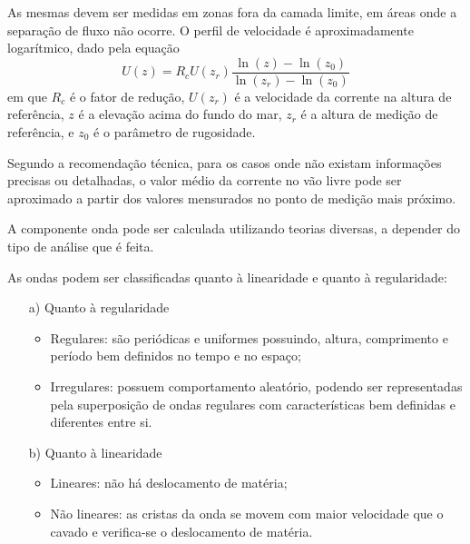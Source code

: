 As mesmas devem ser medidas em zonas fora da camada limite, em áreas onde a separação de fluxo não ocorre.
O perfil de velocidade é aproximadamente logarítmico, dado pela equação
\begin{equation}
\label{eq:viv-eq1}
U(z) = R_c U(z_r) \frac{\ln{(z)}- \ln(z_0)}{\ln (z_r)- \ln (z_0)}
\end{equation}
em que $R_c$ é o fator de redução, $U(z_r)$ é a velocidade da corrente na altura de referência, $z$ é a elevação acima do fundo do mar, $z_r$ é a altura de medição de referência, e $z_0$ é o parâmetro de rugosidade.

Segundo a recomendação técnica, para os casos onde não existam informações precisas ou detalhadas, o valor médio da corrente no vão livre pode ser aproximado a partir dos valores mensurados no ponto de medição mais próximo.

A componente onda pode ser calculada utilizando teorias diversas, a depender do tipo de análise que é feita.

As ondas podem ser classificadas quanto à linearidade e quanto à regularidade:
\begin{itemize}
	\item[a)] Quanto à regularidade
	\begin{itemize}
		\item Regulares: são periódicas e uniformes possuindo, altura, comprimento e período bem definidos no tempo e no espaço;

		\item Irregulares: possuem comportamento aleatório, podendo ser representadas pela superposição de ondas regulares com características bem definidas e diferentes entre si.
	\end{itemize}

	\item[b)] Quanto à linearidade

	\begin{itemize}
		\item Lineares: não há deslocamento de matéria;
		\item Não lineares: as cristas da onda se movem com maior velocidade que o cavado e verifica-se o deslocamento de matéria.
	\end{itemize}
\end{itemize}

